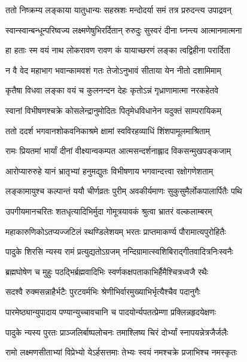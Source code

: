\twolineshloka
{ततो निष्क्रम्य लङ्काया यातुधान्यः सहस्रशः}
{मन्दोदर्या समं तत्र प्ररुदन्त्य उपाद्रवन्} %

\twolineshloka
{स्वान्स्वान्बन्धून्परिष्वज्य लक्ष्मणेषुभिरर्दितान्}
{रुरुदुः सुस्वरं दीना घ्नन्त्य आत्मानमात्मना} %

\twolineshloka
{हा हताः स्म वयं नाथ लोकरावण रावण}
{कं यायाच्छरणं लङ्का त्वद्विहीना परार्दिता} %

\twolineshloka
{न वै वेद महाभाग भवान्कामवशं गतः}
{तेजोऽनुभावं सीताया येन नीतो दशामिमाम्} %

\twolineshloka
{कृतैषा विधवा लङ्का वयं च कुलनन्दन}
{देहः कृतोऽन्नं गृध्राणामात्मा नरकहेतवे} %



\twolineshloka
{स्वानां विभीषणश्चक्रे कोसलेन्द्रानुमोदितः}
{पितृमेधविधानेन यदुक्तं साम्परायिकम्} %

\twolineshloka
{ततो ददर्श भगवानशोकवनिकाश्रमे}
{क्षामां स्वविरहव्याधिं शिंशपामूलमाश्रिताम्} %

\twolineshloka
{रामः प्रियतमां भार्यां दीनां वीक्ष्यान्वकम्पत}
{आत्मसन्दर्शनाह्लाद विकसन्मुखपङ्कजाम्} %

\twolineshloka
{आरोप्यारुरुहे यानं भ्रातृभ्यां हनुमद्युतः}
{विभीषणाय भगवान्दत्त्वा रक्षोगणेशताम्} %

\twolineshloka
{लङ्कामायुश्च कल्पान्तं ययौ चीर्णव्रतः पुरीम्}
{अवकीर्यमाणः सुकुसुमैर्लोकपालार्पितैः पथि} %

\twolineshloka
{उपगीयमानचरितः शतधृत्यादिभिर्मुदा}
{गोमूत्रयावकं श्रुत्वा भ्रातरं वल्कलाम्बरम्} %

\twolineshloka
{महाकारुणिकोऽतप्यज्जटिलं स्थण्डिलेशयम्}
{भरतः प्राप्तमाकर्ण्य पौरामात्यपुरोहितैः} %

\twolineshloka
{पादुके शिरसि न्यस्य रामं प्रत्युद्यतोऽग्रजम्}
{नन्दिग्रामात्स्वशिबिराद्गीतवादित्रनिःस्वनैः} %

\twolineshloka
{ब्रह्मघोषेण च मुहुः पठद्भिर्ब्रह्मवादिभिः}
{स्वर्णकक्षपताकाभिर्हैमैश्चित्रध्वजै रथैः} %

\twolineshloka
{सदश्वै रुक्मसन्नाहैर्भटैः पुरटवर्मभिः}
{श्रेणीभिर्वारमुख्याभिर्भृत्यैश्चैव पदानुगैः} %

\twolineshloka
{पारमेष्ठ्यान्युपादाय पण्यान्युच्चावचानि च}
{पादयोर्न्यपतत्प्रेम्णा प्रक्लिन्नहृदयेक्षणः} %

\twolineshloka
{पादुके न्यस्य पुरतः प्राञ्जलिर्बाष्पलोचनः}
{तमाश्लिष्य चिरं दोर्भ्यां स्नापयन्नेत्रजैर्जलैः} %

\twolineshloka
{रामो लक्ष्मणसीताभ्यां विप्रेभ्यो येऽर्हसत्तमाः}
{तेभ्यः स्वयं नमश्चक्रे प्रजाभिश्च नमस्कृतः} %

